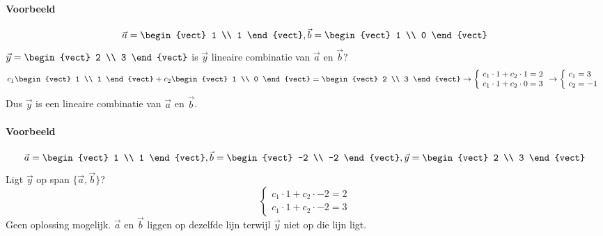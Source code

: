 \paragraph{Voorbeeld} \[\vec{a} = \begin{vect} 1 \\ 1 \end{vect}, \vec{b} = \begin{vect} 1 \\ 0 \end{vect} \]
$\vec{y} = \begin{vect} 2 \\ 3 \end{vect} $ is $\vec{y}$ lineaire combinatie van $\vec{a}$ en $\vec{b}$?
\[ c_1 \begin{vect} 1 \\ 1 \end{vect} + c_2 \begin{vect} 1 \\ 0 \end{vect} = \begin{vect} 2 \\ 3 \end{vect} \to \left\{\!\begin{array}{l} c_1 \cdot 1 + c_2 \cdot 1 = 2 \\ c_1 \cdot 1 + c_2 \cdot 0 = 3 \end{array}\!\right. \to \left\{\!\begin{array}{l} c_1 = 3 \\ c_2 = -1 \end{array}\right. \]
Dus $\vec{y}$ is een lineaire combinatie van $\vec{a}$ en $\vec{b}$.

\paragraph{Voorbeeld} \[ \vec{a} = \begin{vect} 1 \\ 1 \end{vect}, \vec{b} = \begin{vect} -2 \\ -2 \end{vect}, \vec{y} = \begin{vect} 2 \\ 3 \end{vect} \]
Ligt $\vec{y}$ op span $\{ \vec{a}, \vec{b} \}$?
\[ \left\{\!\begin{array}{l} c_1 \cdot 1 + c_2 \cdot -2 = 2 \\ c_1 \cdot 1 + c_2 \cdot -2 = 3 \end{array}\right.\]
Geen oplossing mogelijk. $\vec{a}$ en $\vec{b}$ liggen op dezelfde lijn terwijl $\vec{y}$ niet op die lijn ligt.

